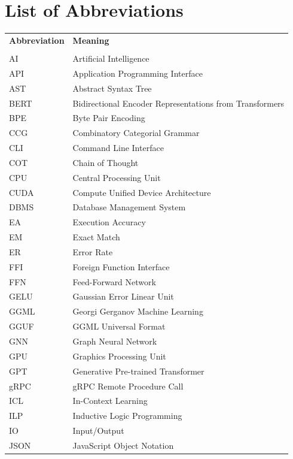 \section*{List of Abbreviations}

\begin{tabular}{ll}

\textbf{Abbreviation} & \textbf{Meaning} \\
\\
AI       & Artificial Intelligence \\
API      & Application Programming Interface \\
AST      & Abstract Syntax Tree \\
BERT     & Bidirectional Encoder Representations from Transformers \\
BPE      & Byte Pair Encoding \\
CCG      & Combinatory Categorial Grammar \\
CLI      & Command Line Interface \\
COT      & Chain of Thought \\
CPU      & Central Processing Unit \\
CUDA     & Compute Unified Device Architecture \\
DBMS     & Database Management System \\
EA       & Execution Accuracy \\
EM       & Exact Match \\
ER       & Error Rate \\
FFI      & Foreign Function Interface \\
FFN      & Feed-Forward Network \\
GELU     & Gaussian Error Linear Unit \\
GGML     & Georgi Gerganov Machine Learning \\
GGUF     & GGML Universal Format \\
GNN      & Graph Neural Network \\
GPU      & Graphics Processing Unit \\
GPT      & Generative Pre-trained Transformer \\
gRPC     & gRPC Remote Procedure Call \\
ICL      & In-Context Learning \\
ILP      & Inductive Logic Programming \\
IO       & Input/Output \\
JSON     & JavaScript Object Notation \\

\end{tabular}
